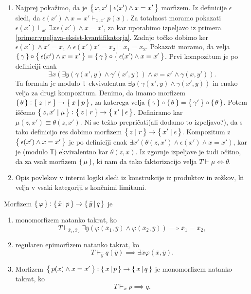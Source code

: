 \documentclass[../kategoricna_logika.tex]{subfiles}
\begin{document}
\begin{dokaz}
\begin{enumerate}[label=(\roman*)]
  \item Najprej pokažimo, da je $\left\lbrace\,x,x' \mid \epsilon(x') \land x = x'\,\right\rbrace$ morfizem.
    Iz definicije $\epsilon$ sledi, da $\epsilon(x') \land x = x' \vdash_{x,x'} p(x)$.
    Za totalnost moramo pokazati $\epsilon(x') \vdash_{x'} \exists x \epsilon(x') \land x=x'$,
    za kar uporabimo izpeljavo iz primera \ref{primer:vpeljava-eksist-kvantifikatorja}.
    Zadnjo točko dobimo ker $\epsilon(x') \land x'=x_1 \land \epsilon(x') x'= x_2 \vdash x_1 = x_2$.
    Pokazati moramo, da velja $\left\lbrace\,\gamma\,\right\rbrace \circ \left\lbrace\,\epsilon(x') \land x = x'\,\right\rbrace =
    \left\lbrace\,\gamma\,\right\rbrace \circ \left\lbrace\,\epsilon(x') \land x = x'\,\right\rbrace$.
    Prvi kompozitum je po definiciji enak
    \[\exists x( \exists y(\gamma(x',y) \land \gamma'(x',y)) \land x = x' \land \gamma(x,y')). \]
    Ta formula je modulo $\mathbb{T}$ ekvivalentna $\exists y(\gamma(x',y) \land \gamma(x',y))$
    in enako velja za drugi kompozitum.
    Denimo, da imamo morfizem $\left\lbrace\,\theta\,\right\rbrace : \left\lbrace\,z \mid r\,\right\rbrace \to \left\lbrace\,x \mid p\,\right\rbrace$,
    za katerega velja $\left\lbrace\,\gamma\,\right\rbrace \circ \left\lbrace\,\theta\,\right\rbrace = \left\lbrace\,\gamma'\,\right\rbrace \circ \left\lbrace\,\theta\,\right\rbrace$.
    Potem iščemo $\left\lbrace\,z,x' \mid \mu\,\right\rbrace : \left\lbrace\,z \mid r\,\right\rbrace \to \left\lbrace\,x' \mid \epsilon\,\right\rbrace$.
    Definiramo kar $\mu(z,x') \equiv  \theta(z,x')$. Ni se težko prepričati(ali dodamo to izpeljavo?),
    da s tako definicijo res dobimo morfizem $\left\lbrace\,z \mid r\,\right\rbrace \to \left\lbrace\,x' \mid \epsilon\,\right\rbrace$.
    Kompozitum z $\left\lbrace\,\epsilon(x') \land x = x'\,\right\rbrace$ je po definiciji enak
    $\exists x' (\theta(z,x') \land \epsilon(x') \land x=x')$, kar
    je (modulo $\mathbb{T}$) ekvivalentno kar $\theta(z,x)$.
    Iz zgornje izpeljave je tudi očitno, da za vsak morfizem $\left\lbrace\,\mu\,\right\rbrace$,
    ki nam da tako faktorizacijo velja $T \vdash \mu \iff \theta$.

  \item Opis povlekov v interni logiki sledi iz konstrukcije iz produktov
    in zožkov, ki velja v vsaki kategoriji s končnimi limitami.
  \end{enumerate}
\end{dokaz}
\begin{lema}\label{lema:morfizmi-v-sintakticni-kategoriji}
  Morfizem $\left\lbrace\,\varphi\,\right\rbrace : \left\lbrace\,\bar{x}\,\middle|\, p\,\right\rbrace \to \left\lbrace\,\bar{y}\,\middle|\, q\,\right\rbrace$ je
  \begin{enumerate}[label=(\roman*)]
    \item monomorfizem natanko takrat, ko
      $$T \vdash_{\bar{x}_1,\bar{x}_2}  \exists \bar{y} \left( \varphi(\bar{x}_1,\bar{y}) \wedge \varphi(\bar{x}_2,\bar{y}) \right) \implies \bar{x}_1 = \bar{x}_2 ,$$
    \item regularen epimorfizem natanko takrat, ko
      $$T \vdash_{\bar{y}} q(\bar{y}) \implies \exists \bar{x} \varphi(\bar{x},\bar{y}).$$
    \item Morfizem $\left\lbrace\,p(\bar{x}) \wedge \bar{x} = \bar{x}'\,\right\rbrace : \left\lbrace\,\bar{x}\,\middle|\, p \,\right\rbrace \to \left\lbrace\,\bar{x}\,\middle|\, q\,\right\rbrace$ je monomorfizem natanko takrat, ko
      $$T \vdash_{\bar{x}} p \implies q.$$
  \end{enumerate}
\end{lema}
\end{document}
